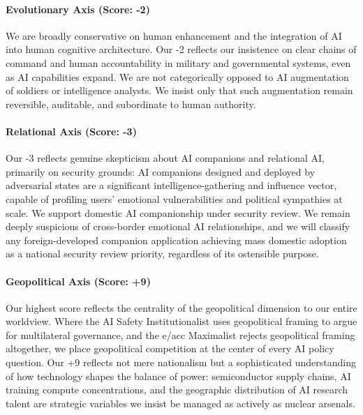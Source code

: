 \paragraph{Evolutionary Axis (Score:
-2)}\label{evolutionary-axis-score--2-3}

We are broadly conservative on human enhancement and the integration of
AI into human cognitive architecture. Our -2 reflects our insistence on
clear chains of command and human accountability in military and
governmental systems, even as AI capabilities expand. We are not
categorically opposed to AI augmentation of soldiers or intelligence
analysts. We insist only that such augmentation remain reversible,
auditable, and subordinate to human authority.

\paragraph{Relational Axis (Score: -3)}\label{relational-axis-score--3}

Our -3 reflects genuine skepticism about AI companions and relational
AI, primarily on security grounds: AI companions designed and deployed
by adversarial states are a significant intelligence-gathering and
influence vector, capable of profiling users' emotional vulnerabilities
and political sympathies at scale. We support domestic AI companionship
under security review. We remain deeply suspicious of cross-border
emotional AI relationships, and we will classify any foreign-developed
companion application achieving mass domestic adoption as a national
security review priority, regardless of its ostensible purpose.

\paragraph{Geopolitical Axis (Score:
+9)}\label{geopolitical-axis-score-9-1}

Our highest score reflects the centrality of the geopolitical dimension
to our entire worldview. Where the AI Safety Institutionalist uses
geopolitical framing to argue for multilateral governance, and the e/acc
Maximalist rejects geopolitical framing altogether, we place
geopolitical competition at the center of every AI policy question. Our
+9 reflects not mere nationalism but a sophisticated understanding of
how technology shapes the balance of power: semiconductor supply chains,
AI training compute concentrations, and the geographic distribution of
AI research talent are strategic variables we insist be managed as
actively as nuclear arsenals.

